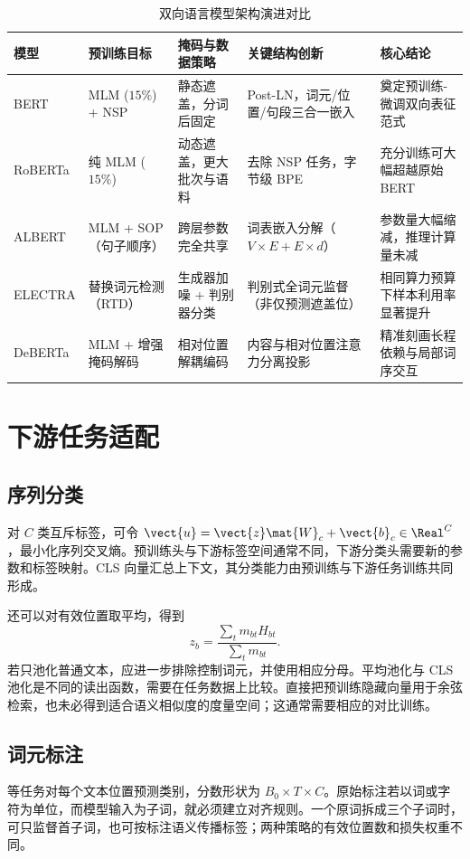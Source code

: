 \documentclass[../textbook.tex]{subfiles}
\begin{document}
\begin{table}[htbp]
\centering
\caption{双向语言模型架构演进对比}\label{tab:mlm-variants}
\begin{tabularx}{\linewidth}{lXXXX}
\toprule
模型 & 预训练目标 & 掩码与数据策略 & 关键结构创新 & 核心结论\\\midrule
BERT & MLM ($15\%$) + NSP & 静态遮盖，分词后固定 & Post-LN，词元/位置/句段三合一嵌入 & 奠定预训练-微调双向表征范式\\
RoBERTa & 纯 MLM ($15\%$) & 动态遮盖，更大批次与语料 & 去除 NSP 任务，字节级 BPE & 充分训练可大幅超越原始 BERT\\
ALBERT & MLM + SOP（句子顺序） & 跨层参数完全共享 & 词表嵌入分解（$V\times E + E\times d$） & 参数量大幅缩减，推理计算量未减\\
ELECTRA & 替换词元检测（RTD） & 生成器加噪 + 判别器分类 & 判别式全词元监督（非仅预测遮盖位） & 相同算力预算下样本利用率显著提升\\
DeBERTa & MLM + 增强掩码解码 & 相对位置解耦编码 & 内容与相对位置注意力分离投影 & 精准刻画长程依赖与局部词序交互\\
\bottomrule
\end{tabularx}
\end{table}

\section{下游任务适配}
\optional
\subsection{序列分类}
对 $C$ 类互斥标签，可令 $\vect{u}=\vect{z}\mat{W}_c+\vect{b}_c\in\Real^C$，最小化序列交叉熵。预训练头与下游标签空间通常不同，下游分类头需要新的参数和标签映射。CLS 向量汇总上下文，其分类能力由预训练与下游任务训练共同形成。

还可以对有效位置取平均，得到
\begin{equation}
 z_b=\frac{\sum_t m_{bt}H_{bt}}{\sum_t m_{bt}}.
\end{equation}
若只池化普通文本，应进一步排除控制词元，并使用相应分母。平均池化与 CLS 池化是不同的读出函数，需要在任务数据上比较。直接把预训练隐藏向量用于余弦检索，也未必得到适合语义相似度的度量空间；这通常需要相应的对比训练。

\subsection{词元标注}
等任务对每个文本位置预测类别，分数形状为 $B_0\times T\times C$。原始标注若以词或字符为单位，而模型输入为子词，就必须建立对齐规则。一个原词拆成三个子词时，可只监督首子词，也可按标注语义传播标签；两种策略的有效位置数和损失权重不同。
\end{document}
